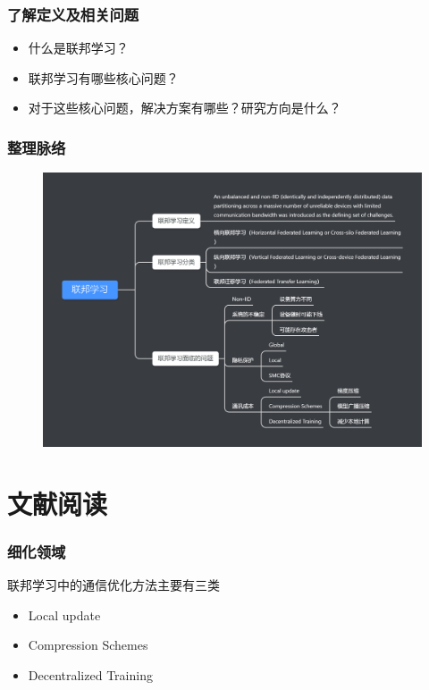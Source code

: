 \documentclass[hyperref={pdfpagelabels=false}]{beamer}
\begin{document}
\begin{frame}
	\frametitle{了解定义及相关问题}
	\begin{itemize}
		\item 什么是联邦学习？
		\item 联邦学习有哪些核心问题？
		\item 对于这些核心问题，解决方案有哪些？研究方向是什么？
	\end{itemize}
\end{frame}

\begin{frame}
	\frametitle{整理脉络}
	\begin{figure}
		\centering
		\includegraphics[width=\textwidth]{./figure/mubu.png}
	\end{figure}
\end{frame}


\section{文献阅读}
\begin{frame}
	\tableofcontents[currentsection]
\end{frame} 

\begin{frame}
	\frametitle{细化领域}
	联邦学习中的通信优化方法主要有三类
	\begin{itemize}
		\item Local update
		\item Compression Schemes
		\item Decentralized Training
	\end{itemize}
	
\end{frame}
\end{document}
